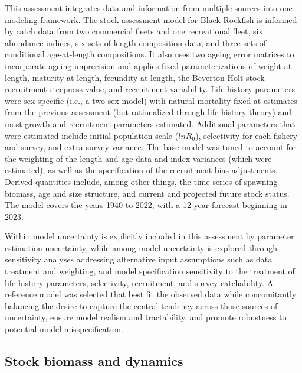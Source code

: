 \documentclass[11pt,
  english,
  letterpaper,
]{article}
\begin{document}
This assessment integrates data and information from multiple sources into one modeling framework. The stock assessment model for Black Rockfish is informed by catch data from two commercial fleets and one recreational fleet, six abundance indices, six sets of length composition data, and three sets of conditional age-at-length compositions. It also uses two ageing error matrices to incorporate ageing imprecision and applies fixed parameterizations of weight-at-length, maturity-at-length, fecundity-at-length, the Beverton-Holt stock-recruitment steepness value, and recruitment variability. Life history parameters were sex-specific (i.e., a two-sex model) with natural mortality fixed at estimates from the previous assessment (but rationalized through life history theory) and most growth and recruitment parameters estimated. Additional parameters that were estimated include initial population scale (\(lnR_0\)), selectivity for each fishery and survey, and extra survey variance. The base model was tuned to account for the weighting of the length and age data and index variances (which were estimated), as well as the specification of the recruitment bias adjustments. Derived quantities include, among other things, the time series of spawning biomass, age and size structure, and current and projected future stock status. The model covers the years 1940 to 2022, with a 12 year forecast beginning in 2023.

Within model uncertainty is explicitly included in this assessment by parameter estimation uncertainty, while among model uncertainty is explored through sensitivity analyses addressing alternative input assumptions such as data treatment and weighting, and model specification sensitivity to the treatment of life history parameters, selectivity, recruitment, and survey catchability. A reference model was selected that best fit the observed data while concomitantly balancing the desire to capture the central tendency across those sources of uncertainty, ensure model realism and tractability, and promote robustness to potential model misspecification.

\hypertarget{stock-biomass-and-dynamics}{%
\subsection*{Stock biomass and dynamics}\label{stock-biomass-and-dynamics}}
\end{document}
